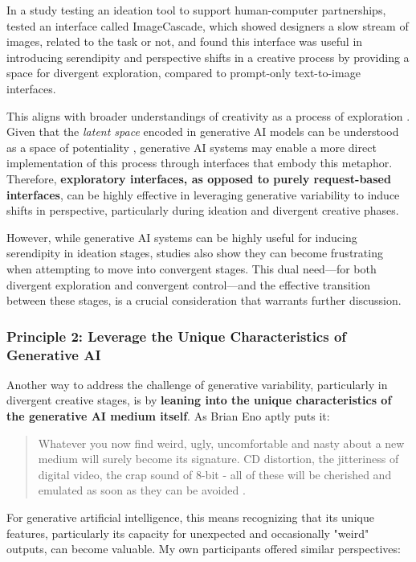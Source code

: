 In a study testing an ideation tool to support human-computer partnerships, \cite{Koch2020-gx} tested an interface called ImageCascade, which showed designers a slow stream of images, related to the task or not, and found this interface was useful in introducing serendipity and perspective shifts in a creative process by providing a space for divergent exploration, compared to prompt-only text-to-image interfaces.

This aligns with broader understandings of creativity as a process of exploration \cite{Boden1998-yn, Wiggins2019-yj}. Given that the \textit{latent space} encoded in generative AI models can be understood as a space of potentiality \cite{Schaerf2024-gf}, generative AI systems may enable a more direct implementation of this process through interfaces that embody this metaphor. Therefore, \textbf{exploratory interfaces, as opposed to purely request-based interfaces}, can be highly effective in leveraging generative variability to induce shifts in perspective, particularly during ideation and divergent creative phases. 

However, while generative AI systems can be highly useful for inducing serendipity in ideation stages, studies also show they can become frustrating when attempting to move into convergent stages. This dual need—for both divergent exploration and convergent control—and the effective transition between these stages, is a crucial consideration that warrants further discussion.

\subsubsection{Principle 2: Leverage the Unique Characteristics of Generative AI}

Another way to address the challenge of generative variability, particularly in divergent creative stages, is by \textbf{leaning into the unique characteristics of the generative AI medium itself}. As Brian Eno aptly puts it:

\begin{quote}
    Whatever you now find weird, ugly, uncomfortable and nasty about a new medium will surely become its signature. CD distortion, the jitteriness of digital video, the crap sound of 8-bit - all of these will be cherished and emulated as soon as they can be avoided \cite{Eno2007-fl}.
\end{quote}

For generative artificial intelligence, this means recognizing that its unique features, particularly its capacity for unexpected and occasionally "weird" outputs, can become valuable. My own participants offered similar perspectives:

